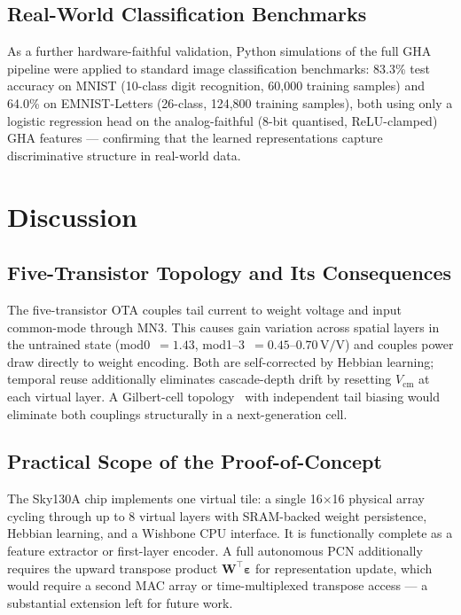 \documentclass[journal,10pt,twoside]{IEEEtran}
\begin{document}
\subsection{Real-World Classification Benchmarks}

As a further hardware-faithful validation, Python simulations of the full
GHA pipeline were applied to standard image classification benchmarks:
83.3\% test accuracy on MNIST (10-class digit recognition, 60{,}000 training
samples) and 64.0\% on EMNIST-Letters (26-class, 124{,}800 training samples),
both using only a logistic regression head on the analog-faithful
(8-bit quantised, ReLU-clamped) GHA features — confirming that the
learned representations capture discriminative structure in real-world data.

\section{Discussion}
\label{sec:discussion}

\subsection{Five-Transistor Topology and Its Consequences}

The five-transistor OTA couples tail current to weight voltage and input
common-mode through MN3.
This causes gain variation across spatial layers in the untrained state
(mod0~$= 1.43$, mod1--3~$= 0.45$--$0.70\,\text{V/V}$) and couples power
draw directly to weight encoding.
Both are self-corrected by Hebbian learning; temporal reuse additionally
eliminates cascade-depth drift by resetting $V_\text{cm}$ at each virtual
layer.
A Gilbert-cell topology~\cite{gilbert1968precise} with independent tail
biasing would eliminate both couplings structurally in a next-generation cell.

\subsection{Practical Scope of the Proof-of-Concept}

The Sky130A chip implements one virtual tile: a single 16$\times$16
physical array cycling through up to 8 virtual layers with SRAM-backed
weight persistence, Hebbian learning, and a Wishbone CPU interface.
It is functionally complete as a feature extractor or first-layer encoder.
A full autonomous PCN additionally requires the upward transpose product
$\mathbf{W}^\top\boldsymbol{\varepsilon}$ for representation update,
which would require a second MAC array or time-multiplexed transpose
access — a substantial extension left for future work.
\end{document}
